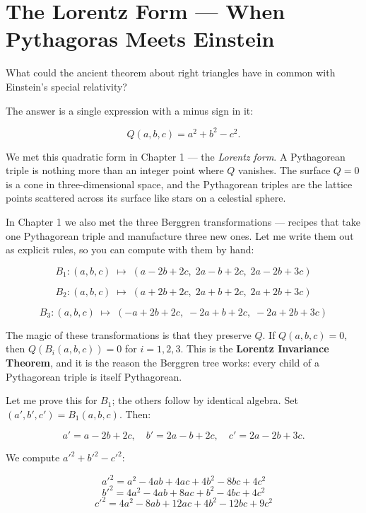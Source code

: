 \ornbreak



\section{The Lorentz Form --- When Pythagoras Meets Einstein}


What could the ancient theorem about right triangles have in common with Einstein's special relativity?

The answer is a single expression with a minus sign in it:

\[
Q(a, b, c) = a^2 + b^2 - c^2.
\]

We met this quadratic form in Chapter 1 --- the \textit{Lorentz form}. A Pythagorean triple is nothing more than an integer point where $Q$ vanishes. The surface $Q = 0$ is a cone in three-dimensional space, and the Pythagorean triples are the lattice points scattered across its surface like stars on a celestial sphere.

In Chapter 1 we also met the three Berggren transformations --- recipes that take one Pythagorean triple and manufacture three new ones. Let me write them out as explicit rules, so you can compute with them by hand:

\[
B_1: (a, b, c) \;\longmapsto\; (a - 2b + 2c,\; 2a - b + 2c,\; 2a - 2b + 3c)
\]

\[
B_2: (a, b, c) \;\longmapsto\; (a + 2b + 2c,\; 2a + b + 2c,\; 2a + 2b + 3c)
\]

\[
B_3: (a, b, c) \;\longmapsto\; (-a + 2b + 2c,\; -2a + b + 2c,\; -2a + 2b + 3c)
\]

The magic of these transformations is that they preserve $Q$. If $Q(a, b, c) = 0$, then $Q(B_i(a, b, c)) = 0$ for $i = 1, 2, 3$. This is the \textbf{Lorentz Invariance Theorem}, and it is the reason the Berggren tree works: every child of a Pythagorean triple is itself Pythagorean.

Let me prove this for $B_1$; the others follow by identical algebra. Set $(a', b', c') = B_1(a, b, c)$. Then:

\[
a' = a - 2b + 2c, \quad b' = 2a - b + 2c, \quad c' = 2a - 2b + 3c.
\]

We compute $a'^2 + b'^2 - c'^2$:

\[
a'^2 = a^2 - 4ab + 4ac + 4b^2 - 8bc + 4c^2
\]
\[
b'^2 = 4a^2 - 4ab + 8ac + b^2 - 4bc + 4c^2
\]
\[
c'^2 = 4a^2 - 8ab + 12ac + 4b^2 - 12bc + 9c^2
\]

